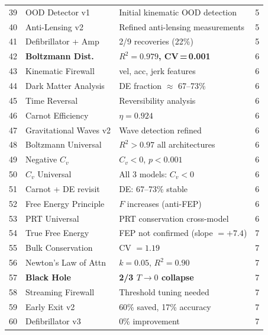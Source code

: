 \documentclass[11pt,a4paper]{article}
\begin{document}
\begin{center}
\begin{longtable}{@{}clll@{}}
39 & OOD Detector v1            & Initial kinematic OOD detection          & 5 \\
40 & Anti-Lensing v2            & Refined anti-lensing measurements        & 5 \\
41 & Defibrillator + Amp        & 2/9 recoveries (22\%)                    & 5 \\
\midrule
42 & \textbf{Boltzmann Dist.}   & \textbf{$R^2 = 0.979$, CV\,=\,0.001}    & 6 \\
43 & Kinematic Firewall         & vel, acc, jerk features                  & 6 \\
44 & Dark Matter Analysis       & DE fraction $\approx$ 67--73\%           & 6 \\
45 & Time Reversal              & Reversibility analysis                   & 6 \\
46 & Carnot Efficiency          & $\eta = 0.924$                           & 6 \\
47 & Gravitational Waves v2     & Wave detection refined                   & 6 \\
48 & Boltzmann Universal        & $R^2 > 0.97$ all architectures           & 6 \\
49 & Negative $C_v$             & $C_v < 0$, $p < 0.001$                  & 6 \\
50 & $C_v$ Universal            & All 3 models: $C_v < 0$                 & 6 \\
51 & Carnot + DE revisit        & DE: 67--73\% stable                      & 6 \\
52 & Free Energy Principle      & $F$ increases (anti-FEP)                 & 6 \\
53 & PRT Universal              & PRT conservation cross-model             & 6 \\
\midrule
54 & True Free Energy           & FEP not confirmed (slope $= +7.4$)      & 7 \\
55 & Bulk Conservation          & CV $= 1.19$                              & 7 \\
56 & Newton's Law of Attn       & $k = 0.05$, $R^2 = 0.90$                & 7 \\
57 & \textbf{Black Hole}        & \textbf{2/3 $T \to 0$ collapse}          & 7 \\
58 & Streaming Firewall         & Threshold tuning needed                  & 7 \\
59 & Early Exit v2              & 60\% saved, 17\% accuracy                & 7 \\
60 & Defibrillator v3           & 0\% improvement                          & 7 \\

\end{longtable}
\end{center}
\end{document}
